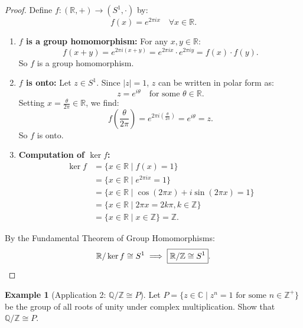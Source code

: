 \documentclass[12pt]{article}
\theoremstyle{definition}
\newtheorem{example}[definition]{Example}
\theoremstyle{plain}
\begin{document}
\begin{proof}
Define $f: (\mathbb{R}, +) \to (S^1, \cdot)$ by:
\[
f(x) = e^{2\pi i x} \quad \forall x \in \mathbb{R}.
\]
\begin{enumerate}
    \item \textbf{$f$ is a group homomorphism:}
    For any $x, y \in \mathbb{R}$:
    \[
    f(x+y) = e^{2\pi i (x+y)} = e^{2\pi i x} \cdot e^{2\pi i y} = f(x) \cdot f(y).
    \]
    So $f$ is a group homomorphism.
    
    \item \textbf{$f$ is onto:}
    Let $z \in S^1$. Since $|z| = 1$, $z$ can be written in polar form as:
    \[
    z = e^{i\theta} \quad \text{for some } \theta \in \mathbb{R}.
    \]
    Setting $x = \frac{\theta}{2\pi} \in \mathbb{R}$, we find:
    \[
    f\left(\frac{\theta}{2\pi}\right) = e^{2\pi i \left(\frac{\theta}{2\pi}\right)} = e^{i\theta} = z.
    \]
    So $f$ is onto.
    
    \item \textbf{Computation of $\ker f$:}
    \begin{align*}
    \ker f &= \{ x \in \mathbb{R} \mid f(x) = 1 \} \\
    &= \{ x \in \mathbb{R} \mid e^{2\pi i x} = 1 \} \\
    &= \{ x \in \mathbb{R} \mid \cos(2\pi x) + i\sin(2\pi x) = 1 \} \\
    &= \{ x \in \mathbb{R} \mid 2\pi x = 2k\pi, k \in \mathbb{Z} \} \\
    &= \{ x \in \mathbb{R} \mid x \in \mathbb{Z} \} = \mathbb{Z}.
    \end{align*}
\end{enumerate}
By the Fundamental Theorem of Group Homomorphisms:
\[
\mathbb{R}/\ker f \cong S^1 \implies \boxed{\mathbb{R}/\mathbb{Z} \cong S^1}. \qedhere
\]
\end{proof}

\begin{example}[Application 2: $\mathbb{Q}/\mathbb{Z} \cong P$]
Let $P = \{ z \in \mathbb{C} \mid z^n = 1 \text{ for some } n \in \mathbb{Z}^+ \}$ be the group of all roots of unity under complex multiplication. Show that $\mathbb{Q}/\mathbb{Z} \cong P$.
\end{example}
\end{document}

